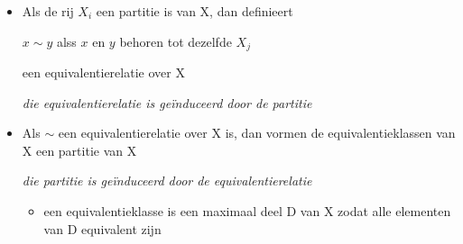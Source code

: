\documentclass{seminar}
\newcommand{\openpagina}{}
\begin{document}
\begin{slide}

\begin{itemize}
\item 
Als de rij $X_i$ een partitie is van X, dan definieert

$x \sim y$ alss $x$ en $y$ behoren tot dezelfde $X_j$

een equivalentierelatie over X

{\em die equivalentierelatie is ge\"{i}nduceerd door de partitie}


\item 
Als $\sim$ een equivalentierelatie over X is, dan vormen de
equivalentieklassen van X een partitie van X

{\em die partitie is ge\"{i}nduceerd door de equivalentierelatie}

\begin{itemize}
\item[]
{\footnotesize een equivalentieklasse is een maximaal deel D van X zodat alle
  elementen van D equivalent zijn}

\end{itemize}
\end{itemize}


\end{slide} \openpagina
\end{document}
